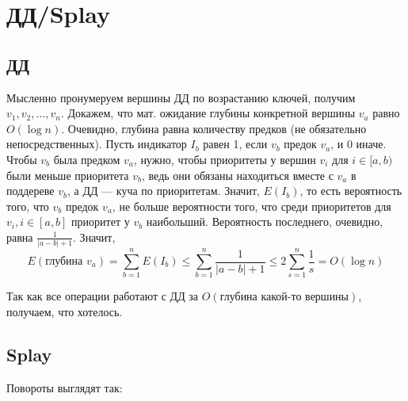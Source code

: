 \section{ДД/Splay}

\subsection{ДД}
Мысленно пронумеруем вершины ДД по возрастанию ключей, получим $v_1, v_2, \ldots, v_n$. Докажем, что мат. ожидание глубины конкретной вершины $v_a$ равно $O(\log n)$. Очевидно, глубина равна количеству предков (не обязательно непосредственных). Пусть индикатор $I_b$ равен 1, если $v_b$ предок $v_a$, и 0 иначе. Чтобы $v_b$ была предком $v_a$, нужно, чтобы приоритеты у вершин $v_i$ для $i \in [a, b)$ были меньше приоритета $v_b$, ведь они обязаны находиться вместе с $v_a$ в поддереве $v_b$, а ДД --- куча по приоритетам. Значит, $E(I_b)$, то есть вероятность того, что $v_b$ предок $v_a$, не больше вероятности того, что среди приоритетов для $v_i, i \in [a, b]$ приоритет у $v_b$ наибольший. Вероятность последнего, очевидно, равна $\frac{1}{|a - b| + 1}$. Значит,
\[
E(\text{глубина }v_a) = \sum_{b = 1}^n E(I_b) \leq \sum_{b = 1}^n \frac{1}{|a - b| + 1} \leq 2 \sum_{s = 1}^{n} \frac{1}{s} = O(\log n)
\]

Так как все операции работают с ДД за $O(\text{глубина какой-то вершины})$, получаем, что хотелось.

\subsection{Splay}

Повороты выглядят так:


